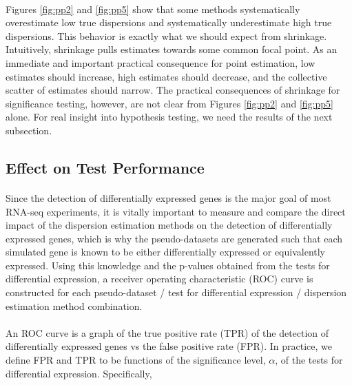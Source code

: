\documentclass[10pt]{article}
\begin{document}
\paragraph{} \indent Figures \ref{fig:pp2} and \ref{fig:pp5} show that some methods systematically overestimate low true dispersions and systematically underestimate high true dispersions. This behavior is exactly what we should expect from shrinkage. Intuitively, shrinkage pulls estimates towards some common focal point. As an immediate and important practical consequence for point estimation, low estimates should increase, high estimates should decrease, and the collective scatter of estimates should narrow. The practical consequences of shrinkage for significance testing, however, are not clear from Figures \ref{fig:pp2} and \ref{fig:pp5} alone. For real insight into hypothesis testing, we need the results of the next subsection.



\subsection*{Effect on Test Performance} \label{subsec:test}

\paragraph{} \indent Since the detection of differentially expressed genes is the major goal of most RNA-seq experiments, it is vitally important to measure and compare the direct impact of the dispersion estimation methods on the detection of differentially expressed genes, which is why the pseudo-datasets are generated such that each simulated gene is known to be either differentially expressed or equivalently expressed. Using this knowledge and the p-values obtained from the tests for differential expression, a receiver operating characteristic (ROC) curve is constructed for each pseudo-dataset / test for differential expression  / dispersion estimation method combination. 

\paragraph{} \indent  
An ROC curve is a graph of the true positive rate (TPR) of the detection of differentially expressed genes vs the false positive rate (FPR). In practice, we define FPR and TPR to be functions of the significance level, $\alpha$, of the tests for differential expression. Specifically,
   
\end{document}
